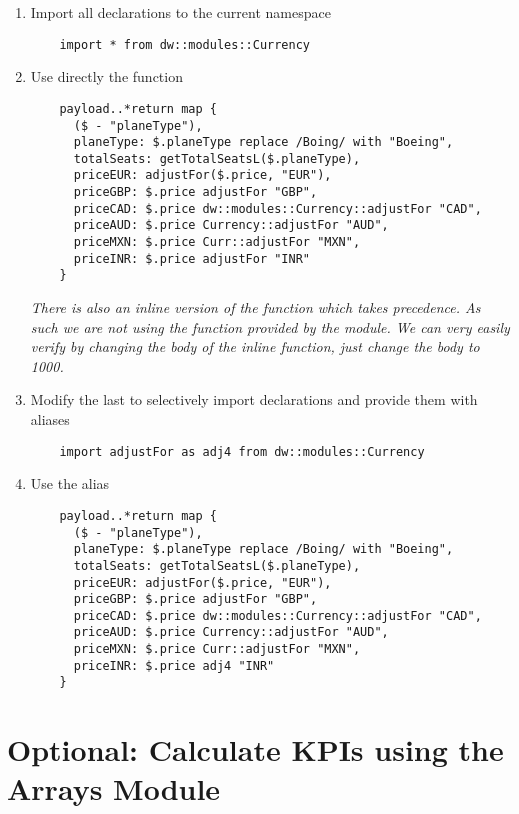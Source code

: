\begin{enumerate}[resume*]
\begin{lstlisting}
    }
  \end{lstlisting}
\item Import all declarations to the current namespace
  \begin{lstlisting}
    import * from dw::modules::Currency
  \end{lstlisting}
\item Use directly the  function
  \begin{lstlisting}
    payload..*return map {
      ($ - "planeType"),
      planeType: $.planeType replace /Boing/ with "Boeing",
      totalSeats: getTotalSeatsL($.planeType),
      priceEUR: adjustFor($.price, "EUR"),
      priceGBP: $.price adjustFor "GBP",
      priceCAD: $.price dw::modules::Currency::adjustFor "CAD",
      priceAUD: $.price Currency::adjustFor "AUD",
      priceMXN: $.price Curr::adjustFor "MXN",
      priceINR: $.price adjustFor "INR"
    }
  \end{lstlisting}
  \emph{
    There is also an inline version of the  function which takes precedence.
    As such we are not using the function provided by the module.  We can very easily
    verify by changing the body of the inline function, just change the body to 1000.
  }
\item Modify the last  to selectively import declarations and provide them with aliases
  \begin{lstlisting}
    import adjustFor as adj4 from dw::modules::Currency
  \end{lstlisting}
\item Use the  alias
  \begin{lstlisting}
    payload..*return map {
      ($ - "planeType"),
      planeType: $.planeType replace /Boing/ with "Boeing",
      totalSeats: getTotalSeatsL($.planeType),
      priceEUR: adjustFor($.price, "EUR"),
      priceGBP: $.price adjustFor "GBP",
      priceCAD: $.price dw::modules::Currency::adjustFor "CAD",
      priceAUD: $.price Currency::adjustFor "AUD",
      priceMXN: $.price Curr::adjustFor "MXN",
      priceINR: $.price adj4 "INR"
    }
  \end{lstlisting}
\end{enumerate}  


\section{Optional: Calculate KPIs using the Arrays Module}


